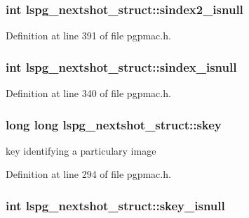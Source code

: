 \hypertarget{structlspg__nextshot__struct_a28e0b5c32a2741ef22edeb9d35b04e4d}{
\subsubsection[{sindex2\-\_\-isnull}]{\setlength{\rightskip}{0pt plus 5cm}int lspg\-\_\-nextshot\-\_\-struct\-::sindex2\-\_\-isnull}}\label{structlspg__nextshot__struct_a28e0b5c32a2741ef22edeb9d35b04e4d}


Definition at line 391 of file pgpmac.\-h.

\hypertarget{structlspg__nextshot__struct_a7ca4fbc86974d1b75a681ba5ecaaf5af}{
\subsubsection[{sindex\-\_\-isnull}]{\setlength{\rightskip}{0pt plus 5cm}int lspg\-\_\-nextshot\-\_\-struct\-::sindex\-\_\-isnull}}\label{structlspg__nextshot__struct_a7ca4fbc86974d1b75a681ba5ecaaf5af}


Definition at line 340 of file pgpmac.\-h.

\hypertarget{structlspg__nextshot__struct_af64a4e3f17752b5f1f05fb15d6f48382}{
\subsubsection[{skey}]{\setlength{\rightskip}{0pt plus 5cm}long long lspg\-\_\-nextshot\-\_\-struct\-::skey}}\label{structlspg__nextshot__struct_af64a4e3f17752b5f1f05fb15d6f48382}


key identifying a particulary image 



Definition at line 294 of file pgpmac.\-h.

\hypertarget{structlspg__nextshot__struct_abd3c69357470052eb79ddd8eddd57b2c}{
\subsubsection[{skey\-\_\-isnull}]{\setlength{\rightskip}{0pt plus 5cm}int lspg\-\_\-nextshot\-\_\-struct\-::skey\-\_\-isnull}}\label{structlspg__nextshot__struct_abd3c69357470052eb79ddd8eddd57b2c}


